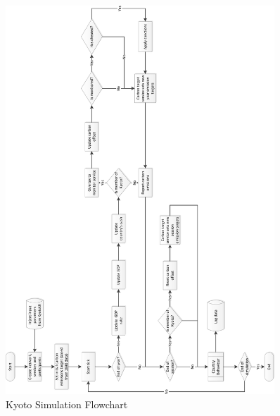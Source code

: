 \begin{figure}[h!]
	\centering
	\includegraphics[width=0.9\textwidth]{img/kyoto_simulation_flowchart.png}
	\caption{Kyoto Simulation Flowchart}
	\label{fig:kyoto_simulation_flowchart}
\end{figure}

